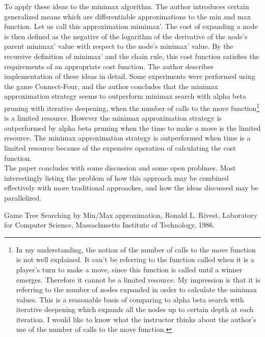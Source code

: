 \documentclass[11pt]{article}
\begin{document}
To apply these ideas to the minimax algorithm. The author introduces certain generalized means which are differentiable approximations to the min and max function. Let us call this approximation mimimax'. The cost of expanding a node is then defined as the negative of the logarithm of the derivative of the node’s parent minimax' value with respect to the node’s minimax' value. By the recursive definition of minimax' and the chain rule, this cost function satisfies the requirements of an appropriate cost function. The author describes implementation of these ideas in detail. Some experiments were performed using the game Connect-Four, and the author concludes that the minimax approximation strategy seems to outperform minimax search with alpha beta pruning with iterative deepening, when the number of calls to the move function\footnote{In my understanding, the notion of the number of calls to the move function is not well explained. It can’t be referring to the function called when it is a player’s turn to make a move, since this function is called until a winner emerges. Therefore it cannot be a limited resource. My impression is that it is referring to the number of nodes expanded in order to calculate the minimax values. This is a reasonable basis of comparing to alpha beta search with iterative deepening which expands all the nodes up to certain depth at each iteration. I would like to know what the instructor thinks about the author’s use of the number of calls to the move function.} is a limited resource. However the minimax approximation strategy is outperformed by alpha beta pruning when the time to make a move is the limited resource. The minimax approximation strategy is outperformed when time is a limited resource because of the expensive operation of calculating the cost function.\\
 
The paper concludes with some discussion and some open problmes. Most interestingly listing the problem of how this approach may be combined effectively with more traditional approaches, and how the ideas discussed may be parallelized.\\

\begin{thebibliography}{99}
Game Tree Searching by Min/Max approximation, Ronald L. Rivest, Laboratory for Computer Science, Massachusetts Institute of Technology, 1986.
\end{thebibliography}
\end{document}
